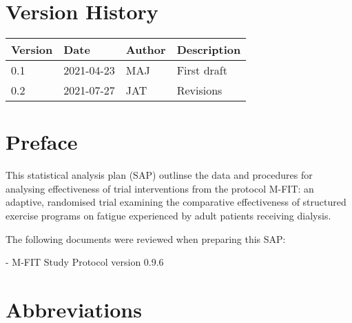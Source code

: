 \documentclass[
]{article}
\title{\currentTitle}
\subtitle{}
\author{}
\date{\vspace{-2.5em}\currentVersion}
\begin{document}
\maketitle

{
  \setcounter{tocdepth}{2}
  \tableofcontents
}

\hypertarget{version-history}{%
  \section*{Version History}\label{version-history}}

\begin{table}[H]
  \renewcommand{\arraystretch}{1.5}
  \begin{center}
    \begin{tabular}{lllp{5cm}}
      \hline
      Version & Date       & Author & Description   \\ \hline
      0.1     & 2021-04-23 & MAJ    & First draft   \\
      0.2     & 2021-07-27 & JAT    & Revisions \\
      \hline
    \end{tabular}
  \end{center}
\end{table}

\clearpage

\hypertarget{preface}{%
  \section*{Preface}\label{Preface}}

This statistical analysis plan (SAP) outlinse the data and procedures for analysing effectiveness of trial interventions from the protocol M-FIT: an adaptive, randomised trial examining the comparative effectiveness of structured exercise programs on fatigue experienced by adult patients receiving dialysis.

The following documents were reviewed when preparing this SAP:

- M-FIT Study Protocol version 0.9.6

\clearpage

\hypertarget{abbreviations}{%
  \section*{Abbreviations}\label{abbreviations}}
\end{document}
